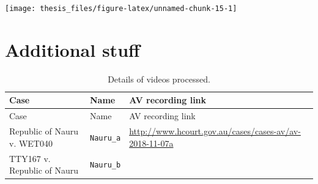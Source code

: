 \documentclass{monashthesis}
\begin{document}
\texttt{[image: thesis\_files/figure-latex/unnamed-chunk-15-1]}

\appendix

\hypertarget{additional-stuff}{%
\chapter{Additional stuff}\label{additional-stuff}}

\begin{longtable}[]{@{}lll@{}}
\caption{Details of videos processed.}\tabularnewline
\toprule
\begin{minipage}[b]{0.42\columnwidth}\raggedright
Case\strut
\end{minipage} & \begin{minipage}[b]{0.14\columnwidth}\raggedright
Name\strut
\end{minipage} & \begin{minipage}[b]{0.35\columnwidth}\raggedright
AV recording link\strut
\end{minipage}\tabularnewline
\midrule
\endfirsthead
\toprule
\begin{minipage}[b]{0.42\columnwidth}\raggedright
Case\strut
\end{minipage} & \begin{minipage}[b]{0.14\columnwidth}\raggedright
Name\strut
\end{minipage} & \begin{minipage}[b]{0.35\columnwidth}\raggedright
AV recording link\strut
\end{minipage}\tabularnewline
\midrule
\endhead
\begin{minipage}[t]{0.42\columnwidth}\raggedright
Republic of Nauru v. WET040\strut
\end{minipage} & \begin{minipage}[t]{0.14\columnwidth}\raggedright
\texttt{Nauru\_a}\strut
\end{minipage} & \begin{minipage}[t]{0.35\columnwidth}\raggedright
\url{http://www.hcourt.gov.au/cases/cases-av/av-2018-11-07a}\strut
\end{minipage}\tabularnewline
\begin{minipage}[t]{0.42\columnwidth}\raggedright
TTY167 v. Republic of Nauru\strut
\end{minipage} & \begin{minipage}[t]{0.14\columnwidth}\raggedright
\texttt{Nauru\_b}\strut
\end{minipage} & \begin{minipage}[t]{0.35\columnwidth}\raggedright

\end{minipage}
\end{longtable}
\end{document}
